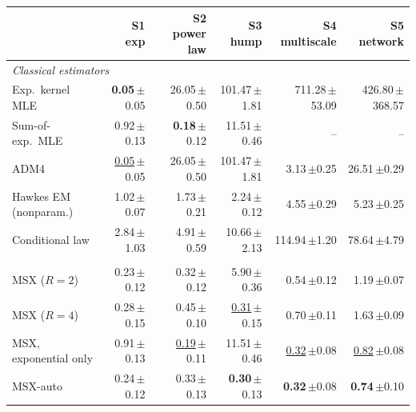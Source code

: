 \begin{tabular}{lrrrrr}
\toprule
& S1 exp & S2 power law & S3 hump & S4 multiscale & S5 network \\
\midrule
\multicolumn{6}{l}{\textit{Classical estimators}} \\[1pt]
\quad Exp.\ kernel MLE & \textbf{0.05}{\scriptsize\,$\pm$0.05} & 26.05{\scriptsize\,$\pm$0.50} & 101.47{\scriptsize\,$\pm$1.81} & 711.28{\scriptsize\,$\pm$53.09} & 426.80{\scriptsize\,$\pm$368.57} \\
\quad Sum-of-exp.\ MLE & 0.92{\scriptsize\,$\pm$0.13} & \textbf{0.18}{\scriptsize\,$\pm$0.12} & 11.51{\scriptsize\,$\pm$0.46} & -- & -- \\
\quad ADM4 & \underline{0.05}{\scriptsize\,$\pm$0.05} & 26.05{\scriptsize\,$\pm$0.50} & 101.47{\scriptsize\,$\pm$1.81} & 3.13{\scriptsize\,$\pm$0.25} & 26.51{\scriptsize\,$\pm$0.29} \\
\quad Hawkes EM (nonparam.) & 1.02{\scriptsize\,$\pm$0.07} & 1.73{\scriptsize\,$\pm$0.21} & 2.24{\scriptsize\,$\pm$0.12} & 4.55{\scriptsize\,$\pm$0.29} & 5.23{\scriptsize\,$\pm$0.25} \\
\quad Conditional law & 2.84{\scriptsize\,$\pm$1.03} & 4.91{\scriptsize\,$\pm$0.59} & 10.66{\scriptsize\,$\pm$2.13} & 114.94{\scriptsize\,$\pm$1.20} & 78.64{\scriptsize\,$\pm$4.79} \\
\addlinespace[3pt]\multicolumn{6}{l}{\textit{Ours}} \\[1pt]
\rowcolor{oursbg} \quad MSX ($R=2$) & 0.23{\scriptsize\,$\pm$0.12} & 0.32{\scriptsize\,$\pm$0.12} & 5.90{\scriptsize\,$\pm$0.36} & 0.54{\scriptsize\,$\pm$0.12} & 1.19{\scriptsize\,$\pm$0.07} \\
\rowcolor{oursbg} \quad MSX ($R=4$) & 0.28{\scriptsize\,$\pm$0.15} & 0.45{\scriptsize\,$\pm$0.10} & \underline{0.31}{\scriptsize\,$\pm$0.15} & 0.70{\scriptsize\,$\pm$0.11} & 1.63{\scriptsize\,$\pm$0.09} \\
\rowcolor{oursbg} \quad MSX, exponential only & 0.91{\scriptsize\,$\pm$0.13} & \underline{0.19}{\scriptsize\,$\pm$0.11} & 11.51{\scriptsize\,$\pm$0.46} & \underline{0.32}{\scriptsize\,$\pm$0.08} & \underline{0.82}{\scriptsize\,$\pm$0.08} \\
\rowcolor{oursbg} \quad MSX-auto & 0.24{\scriptsize\,$\pm$0.12} & 0.33{\scriptsize\,$\pm$0.13} & \textbf{0.30}{\scriptsize\,$\pm$0.13} & \textbf{0.32}{\scriptsize\,$\pm$0.08} & \textbf{0.74}{\scriptsize\,$\pm$0.10} \\
\bottomrule
\end{tabular}